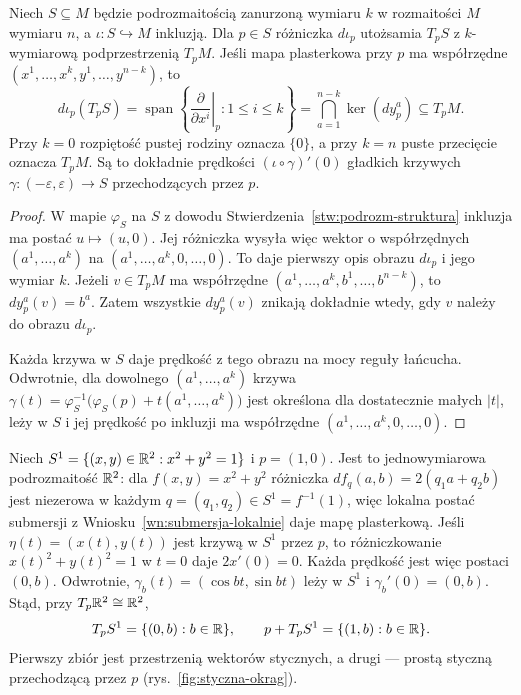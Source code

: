 \begin{stwierdzenie}
\label{stw:styczna-podrozmaitosci}
Niech $S\subseteq M$ będzie podrozmaitością zanurzoną wymiaru $k$
w rozmaitości $M$ wymiaru $n$, a $\iota\colon S\hookrightarrow M$
inkluzją. Dla $p\in S$ różniczka $d\iota_p$ utożsamia $T_pS$
z $k$-wymiarową podprzestrzenią $T_pM$. Jeśli mapa plasterkowa
przy $p$ ma współrzędne $(x^1,\ldots,x^k,y^1,\ldots,y^{n-k})$, to
\[
d\iota_p(T_pS)
=\operatorname{span}\left\{\left.\frac{\partial}{\partial x^i}\right|_p:
1\leq i\leq k\right\}
=\bigcap_{a=1}^{n-k}\ker(dy^a_p)\subseteq T_pM.
\]
Przy $k=0$ rozpiętość pustej rodziny oznacza $\{0\}$, a przy $k=n$
puste przecięcie oznacza $T_pM$.
Są to dokładnie prędkości $(\iota\circ\gamma)'(0)$ gładkich krzywych
$\gamma\colon(-\varepsilon,\varepsilon)\to S$ przechodzących przez $p$.
\end{stwierdzenie}
\begin{proof}
W mapie $\varphi_S$ na $S$ z dowodu
Stwierdzenia~\ref{stw:podrozm-struktura} inkluzja ma postać
$u\mapsto(u,0)$. Jej różniczka wysyła więc wektor o współrzędnych
$(a^1,\ldots,a^k)$ na $(a^1,\ldots,a^k,0,\ldots,0)$.
To daje pierwszy opis obrazu $d\iota_p$ i jego wymiar $k$.
Jeżeli $v\in T_pM$ ma współrzędne $(a^1,\ldots,a^k,b^1,\ldots,b^{n-k})$,
to $dy^a_p(v)=b^a$. Zatem wszystkie $dy^a_p(v)$ znikają dokładnie
wtedy, gdy $v$ należy do obrazu $d\iota_p$.

Każda krzywa w $S$ daje prędkość z tego obrazu na mocy reguły łańcucha.
Odwrotnie, dla dowolnego $(a^1,\ldots,a^k)$ krzywa
$\gamma(t)=\varphi_S^{-1}\bigl(\varphi_S(p)+t(a^1,\ldots,a^k)\bigr)$
jest określona dla dostatecznie małych $|t|$, leży w $S$ i jej prędkość
po inkluzji ma współrzędne $(a^1,\ldots,a^k,0,\ldots,0)$.
\end{proof}

\begin{przyklad}
Niech $S^1=\{(x,y)\in\mathbb{R}^2:x^2+y^2=1\}$ i $p=(1,0)$.
Jest to jednowymiarowa podrozmaitość $\mathbb{R}^2$: dla
$f(x,y)=x^2+y^2$ różniczka $df_q(a,b)=2(q_1a+q_2b)$ jest niezerowa
w każdym $q=(q_1,q_2)\in S^1=f^{-1}(1)$, więc lokalna postać
submersji z Wniosku~\ref{wn:submersja-lokalnie} daje mapę plasterkową.
Jeśli $\eta(t)=(x(t),y(t))$ jest krzywą w $S^1$ przez $p$, to
różniczkowanie $x(t)^2+y(t)^2=1$ w $t=0$ daje $2x'(0)=0$.
Każda prędkość jest więc postaci $(0,b)$. Odwrotnie,
$\gamma_b(t)=(\cos bt,\sin bt)$ leży w $S^1$ i
$\gamma_b'(0)=(0,b)$. Stąd, przy $T_p\mathbb{R}^2\cong\mathbb{R}^2$,
\[
T_pS^1=\{(0,b):b\in\mathbb{R}\},\qquad
p+T_pS^1=\{(1,b):b\in\mathbb{R}\}.
\]
Pierwszy zbiór jest przestrzenią wektorów stycznych, a drugi ---
prostą styczną przechodzącą przez $p$ (rys.~\ref{fig:styczna-okrag}).
\end{przyklad}

